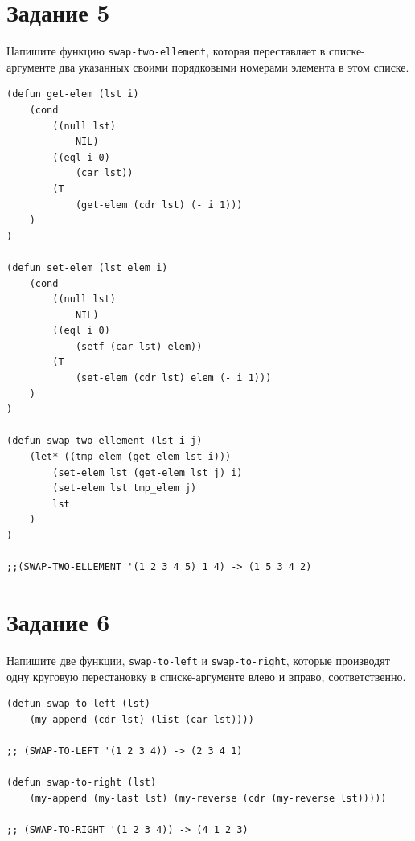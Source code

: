 \documentclass[a4paper,14pt, unknownkeysallowed]{extreport}
\begin{document}
\section{Задание 5}

Напишите функцию \texttt{swap-two-ellement}, которая переставляет в списке-аргументе два указанных своими порядковыми номерами элемента в этом списке.

\begin{center}
\captionsetup{justification=raggedright,singlelinecheck=off}
\begin{lstlisting}[label=lst:parallel_processing,caption=Решение задания 5]
(defun get-elem (lst i)
    (cond
        ((null lst)
            NIL)
        ((eql i 0)
            (car lst))
        (T 
            (get-elem (cdr lst) (- i 1)))
    )
)

(defun set-elem (lst elem i)
    (cond
        ((null lst)
            NIL)
        ((eql i 0)
            (setf (car lst) elem))
        (T 
            (set-elem (cdr lst) elem (- i 1)))
    )
)

(defun swap-two-ellement (lst i j)
    (let* ((tmp_elem (get-elem lst i)))
        (set-elem lst (get-elem lst j) i)
        (set-elem lst tmp_elem j)
        lst
    )
)

;;(SWAP-TWO-ELLEMENT '(1 2 3 4 5) 1 4) -> (1 5 3 4 2)
\end{lstlisting}
\end{center}

\section{Задание 6}

Напишите две функции, \texttt{swap-to-left} и \texttt{swap-to-right}, которые производят одну круговую перестановку в списке-аргументе влево и вправо, соответственно.

\begin{center}
\captionsetup{justification=raggedright,singlelinecheck=off}
\begin{lstlisting}[label=lst:parallel_processing,caption=Решение задания 6]
(defun swap-to-left (lst)
    (my-append (cdr lst) (list (car lst))))

;; (SWAP-TO-LEFT '(1 2 3 4)) -> (2 3 4 1)

(defun swap-to-right (lst)
    (my-append (my-last lst) (my-reverse (cdr (my-reverse lst)))))

;; (SWAP-TO-RIGHT '(1 2 3 4)) -> (4 1 2 3)

\end{lstlisting}
\end{center}
\end{document}
